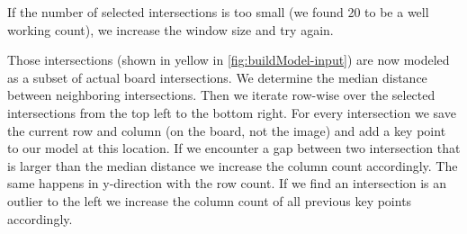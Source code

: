 	If the number of selected intersections is too small (we found 20 to be a well working count), we increase the window size and try again.

	Those intersections (shown in yellow in \autoref{fig:buildModel-input}) are now modeled as a subset of actual board intersections. We determine the median distance between neighboring intersections. Then we iterate row-wise over the selected intersections from the top left to the bottom right. For every intersection we save the current row and column (on the board, not the image) and add a key point to our model at this location. If we encounter a gap between two intersection that is larger than the median distance we increase the column count accordingly. The same happens in y-direction with the row count. If we find an intersection is an outlier to the left we increase the column count of all previous key points accordingly.


